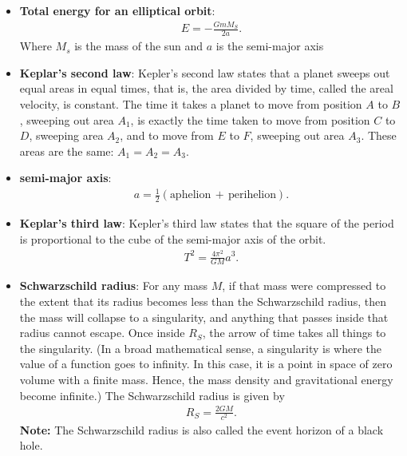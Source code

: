 \documentclass{report}
\begin{document}
\begin{itemize}
        \item \textbf{Total energy for an elliptical orbit}:
            \begin{align*}
                E = -\frac{GmM_{S}}{2a}
            .\end{align*}
            Where $M_{s}$ is the mass of the sun and $a$ is the semi-major axis
    \item \textbf{Keplar's second law}:
        Kepler’s second law states that a planet sweeps out equal areas in equal times, that is, the area divided by time, called the areal velocity, is constant.
        \bigbreak \noindent 
        \bigbreak \noindent 
        The time it takes a planet to move from position \(A\) to \(B\), sweeping out area \(A_1\), is exactly the time taken to move from position \(C\) to \(D\), sweeping area \(A_2\), and to move from \(E\) to \(F\), sweeping out area \(A_3\). These areas are the same: \(A_1 = A_2 = A_3\).
    \item \textbf{semi-major axis}:
        \begin{align*}
            a = \frac{1}{2}(\text{aphelion}\, + \, \text{perihelion})
        .\end{align*}
    \item \textbf{Keplar's third law}: Kepler’s third law states that the square of the period is proportional to the cube of the semi-major axis of the orbit. 
        \begin{align*}
            T^{2} = \frac{4\pi^{2}}{GM}a^{3}            
        .\end{align*}
    \item \textbf{Schwarzschild radius}:
        For any mass $M$, if that mass were compressed to the extent that its radius becomes less than the Schwarzschild radius, then the mass will collapse to a singularity, and anything that passes inside that radius cannot escape. Once inside $R_{S}$, the arrow of time takes all things to the singularity. (In a broad mathematical sense, a singularity is where the value of a function goes to infinity. In this case, it is a point in space of zero volume with a finite mass. Hence, the mass density and gravitational energy become infinite.) The Schwarzschild radius is given by
        \begin{align*}
            R_{S} = \frac{2GM}{c^{2}}
        .\end{align*}
        \bigbreak \noindent 
        \textbf{Note:} The Schwarzschild radius is also called the event horizon of a black hole.
    \end{itemize}
\end{document}
